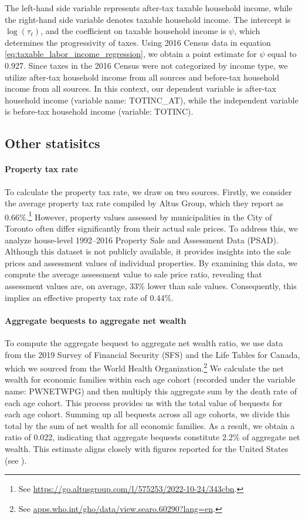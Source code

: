 \documentclass[parskip=full]{article}
\begin{document}
\noindent The left-hand side variable represents after-tax taxable household income, while the right-hand side variable denotes taxable household income. The intercept is $\log(\tau_{\ell})$, and the coefficient on taxable household income is $\psi$, which determines the progressivity of taxes. Using 2016 Census data in equation \eqref{eq:taxable_labor_income_regression}, we obtain a point estimate for $\psi$ equal to 0.927. Since taxes in the 2016 Census were not categorized by income type, we utilize after-tax household income from all sources and before-tax household income from all sources. In this context, our dependent variable is after-tax household income (variable name: TOTINC\_AT), while the independent variable is before-tax household income (variable: TOTINC).

\subsection{Other statisitcs}

\paragraph{Property tax rate}

To calculate the property tax rate, we draw on two sources. Firstly, we consider the average property tax rate compiled by Altus Group, which they report as 0.66\%.\footnote{See \url{https://go.altusgroup.com/l/575253/2022-10-24/343cbn}.} However, property values assessed by municipalities in the City of Toronto often differ significantly from their actual sale prices. To address this, we analyze house-level 1992--2016 Property Sale and Assessment Data (PSAD). Although this dataset is not publicly available, it provides insights into the sale prices and assessment values of individual properties. By examining this data, we compute the average assessment value to sale price ratio, revealing that assessment values are, on average, 33\% lower than sale values. Consequently, this implies an effective property tax rate of 0.44\%.

\paragraph{Aggregate bequests to aggregate net wealth}

To compute the aggregate bequest to aggregate net wealth ratio, we use data from the 2019 Survey of Financial Security (SFS) and the Life Tables for Canada, which we sourced from the World Health Organization.\footnote{See \url{apps.who.int/gho/data/view.searo.60290?lang=en}.} We calculate the net wealth for economic families within each age cohort (recorded under the variable name: PWNETWPG) and then multiply this aggregate sum by the death rate of each age cohort. This process provides us with the total value of bequests for each age cohort. Summing up all bequests across all age cohorts, we divide this total by the sum of net wealth for all economic families. As a result, we obtain a ratio of 0.022, indicating that aggregate bequests constitute 2.2\% of aggregate net wealth. This estimate aligns closely with figures reported for the United States (see \citet{cagetti-denardi-2006}).
\end{document}
